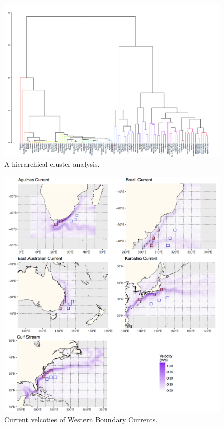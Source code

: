 \documentclass[
]{book}
\begin{document}
\begin{figure}

{\centering \includegraphics[width=1\linewidth]{figures/hierarchical_clustsig} 

}

\caption{A hierarchical cluster analysis.}\label{fig:example15}
\end{figure}

\begin{figure}

{\centering \includegraphics[width=1\linewidth]{figures/Fig01_AvisoMeanVelocityMean} 

}

\caption{Current velcoties of Western Boundary Currents.}\label{fig:example17}
\end{figure}
\end{document}
